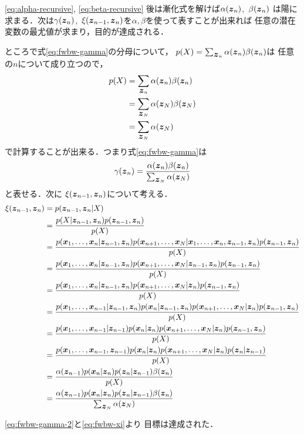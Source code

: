\eqref{eq:alpha-recursive}, \eqref{eq:beta-recursive}
後は漸化式を解けば$\alpha(\bvec{z}_n)$,\ $\beta(\bvec{z}_n)$
は陽に求まる．次は$\gamma(\bvec{z}_n)$,\ $\xi(\bvec{z}_{n-1},\bvec{z}_n)$を$\alpha,\beta$を使って表すことが出来れば
任意の潜在変数の最尤値が求まり，目的が達成される．

ところで式\eqref{eq:fwbw-gamma}の分母について，
$p(X)=\sum_{\bvec{z}_n}\alpha(\bvec{z}_n)\beta(\bvec{z}_n)$は
任意の$n$について成り立つので，
\begin{align}
  p(X) &= \sum_{\bvec{z}_n}\alpha(\bvec{z}_n)\beta(\bvec{z}_n) \\
  &= \sum_{\bvec{z}_N}\alpha(\bvec{z}_N)\beta(\bvec{z}_N) \\
  &= \sum_{\bvec{z}_N}\alpha(\bvec{z}_N) \\
\end{align}
で計算することが出来る．つまり式\eqref{eq:fwbw-gamma}は
\begin{align}
  \gamma(\bvec{z}_n) = \frac{\alpha(\bvec{z}_n)\beta(\bvec{z}_n)}{\sum_{\bvec{z}_N}\alpha(\bvec{z}_N)} \label{eq:fwbw-gamma-2}
\end{align}
と表せる．次に
$\xi(\bvec{z}_{n-1},\bvec{z}_n)$について考える．
\begin{align}
  \xi(\bvec{z}_{n-1},\bvec{z}_n) &= p(\bvec{z}_{n-1},\bvec{z}_n|X) \\
  &= \frac{p(X|\bvec{z}_{n-1},\bvec{z}_n)p(\bvec{z}_{n-1},\bvec{z}_n)}{p(X)} \\
  &= \frac{p(\bvec{x}_1,\dots,\bvec{x}_n|\bvec{z}_{n-1},\bvec{z}_n)p(\bvec{x}_{n+1},\dots,\bvec{x}_N|\bvec{x}_1,\dots,\bvec{x}_n,\bvec{z}_{n-1},\bvec{z}_n)p(\bvec{z}_{n-1},\bvec{z}_n)}{p(X)} \\
  &= \frac{p(\bvec{x}_1,\dots,\bvec{x}_n|\bvec{z}_{n-1},\bvec{z}_n)p(\bvec{x}_{n+1},\dots,\bvec{x}_N|\bvec{z}_{n-1},\bvec{z}_n)p(\bvec{z}_{n-1},\bvec{z}_n)}{p(X)} \\
  &= \frac{p(\bvec{x}_1,\dots,\bvec{x}_n|\bvec{z}_{n-1},\bvec{z}_n)p(\bvec{x}_{n+1},\dots,\bvec{x}_N|\bvec{z}_n)p(\bvec{z}_{n-1},\bvec{z}_n)}{p(X)} \\
  &= \frac{p(\bvec{x}_1,\dots,\bvec{x}_{n-1}|\bvec{z}_{n-1},\bvec{z}_n)p(\bvec{x}_n|\bvec{z}_{n-1},\bvec{z}_n)p(\bvec{x}_{n+1},\dots,\bvec{x}_N|\bvec{z}_n)p(\bvec{z}_{n-1},\bvec{z}_n)}{p(X)} \\
  &= \frac{p(\bvec{x}_1,\dots,\bvec{x}_{n-1}|\bvec{z}_{n-1})p(\bvec{x}_n|\bvec{z}_n)p(\bvec{x}_{n+1},\dots,\bvec{x}_N|\bvec{z}_n)p(\bvec{z}_{n-1},\bvec{z}_n)}{p(X)} \\
  &= \frac{p(\bvec{x}_1,\dots,\bvec{x}_{n-1},\bvec{z}_{n-1})p(\bvec{x}_n|\bvec{z}_n)p(\bvec{x}_{n+1},\dots,\bvec{x}_N|\bvec{z}_n)p(\bvec{z}_n|\bvec{z}_{n-1})}{p(X)} \\
  &= \frac{\alpha(\bvec{z}_{n-1})p(\bvec{x}_n|\bvec{z}_n)p(\bvec{z}_n|\bvec{z}_{n-1})\beta(\bvec{z}_n)}{p(X)} \\
  &= \frac{\alpha(\bvec{z}_{n-1})p(\bvec{x}_n|\bvec{z}_n)p(\bvec{z}_n|\bvec{z}_{n-1})\beta(\bvec{z}_n)}{\sum_{\bvec{z}_N}\alpha(\bvec{z}_N)} \label{eq:fwbw-xi}\\
\end{align}

\eqref{eq:fwbw-gamma-2}と\eqref{eq:fwbw-xi}より
目標は達成された．


